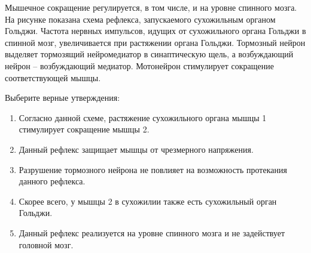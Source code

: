
Мышечное
сокращение регулируется, в том числе, и на уровне спинного мозга. На рисунке
показана схема рефлекса, запускаемого сухожильным органом Гольджи. Частота
нервных импульсов, идущих от сухожильного органа Гольджи в спинной мозг,
увеличивается при растяжении органа Гольджи. Тормозный нейрон выделяет
тормозящий нейромедиатор в синаптическую щель, а возбуждающий нейрон –
возбуждающий медиатор. Мотонейрон стимулирует сокращение соответствующей мышцы.


Выберите
верные утверждения:

\begin{enumerate}
    \item Согласно данной схеме, растяжение сухожильного органа мышцы 1 стимулирует сокращение мышцы 2.
    \item Данный рефлекс защищает мышцы от чрезмерного напряжения.
    \item Разрушение тормозного нейрона не повлияет на возможность протекания данного рефлекса.
    \item Скорее всего, у мышцы 2 в сухожилии также есть сухожильный орган Гольджи.
    \item Данный рефлекс реализуется на уровне спинного мозга и не задействует головной мозг.
\end{enumerate}

\explanationSection

